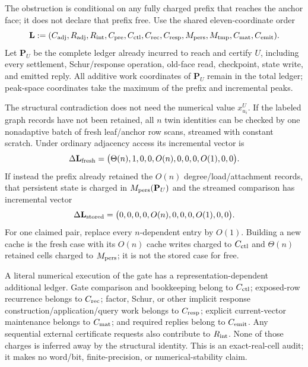 \begin{remark}
\label{rem:notched-sun-rppr-trace-ledger}
The obstruction is conditional on any fully charged prefix that reaches the
anchor face; it does not declare that prefix free.  Use the shared
eleven-coordinate order
\begin{equation*}
 \mathbf L:=
 (C_{\rm adj},R_{\rm adj},R_{\rm int},C_{\rm pre},C_{\rm ctl},
  C_{\rm rec},C_{\rm resp},M_{\rm pers},M_{\rm tmp},C_{\rm mat},C_{\rm emit}).
\end{equation*}
Let $\mathbf P_U$ be the complete ledger already incurred to reach and certify
$U$, including every settlement, Schur/response operation, old-face read,
checkpoint, state write, and emitted reply.  All additive work coordinates of
$\mathbf P_U$ remain in the total ledger; peak-space coordinates take the
maximum of the prefix and incremental peaks.

The structural contradiction does not need the numerical value
$x^U_{u_i}$.  If the labeled graph records have not been retained, all $n$
twin identities can be checked by one nonadaptive batch of fresh leaf/anchor
row scans, streamed with constant scratch.  Under ordinary adjacency access
its incremental vector is
\begin{equation}
 \Delta\mathbf L_{\rm fresh}
 =\bigl(\Theta(n),1,0,0,O(n),0,0,0,O(1),0,0\bigr).
 \label{eq:notched-sun-fresh-audit-vector}
\end{equation}
If instead the prefix already retained the $O(n)$ degree/load/attachment
records, that persistent state is charged in $M_{\rm pers}(\mathbf P_U)$ and
the streamed comparison has incremental vector
\begin{equation}
 \Delta\mathbf L_{\rm stored}
 =\bigl(0,0,0,0,O(n),0,0,0,O(1),0,0\bigr).
 \label{eq:notched-sun-stored-audit-vector}
\end{equation}
For one claimed pair, replace every $n$-dependent entry by $O(1)$.  Building a
new cache is the fresh case with its $O(n)$ cache writes charged to
$C_{\rm ctl}$ and $\Theta(n)$ retained cells charged to $M_{\rm pers}$; it is
not the stored case for free.

A literal numerical execution of the gate has a representation-dependent
additional ledger.  Gate comparison and bookkeeping belong to $C_{\rm ctl}$;
exposed-row recurrence belongs to $C_{\rm rec}$; factor, Schur, or other
implicit response construction/application/query work belongs to
$C_{\rm resp}$; explicit current-vector maintenance belongs to $C_{\rm mat}$;
and required replies belong to $C_{\rm emit}$.  Any sequential external
certificate requests also contribute to $R_{\rm int}$.  None of those charges
is inferred away by the structural identity.
This is an exact-real-cell audit; it makes no word/bit, finite-precision, or
numerical-stability claim.


\end{remark}
